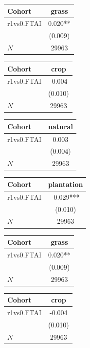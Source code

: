 {
\def\sym#1{\ifmmode^{#1}\else\(^{#1}\)\fi}
\begin{tabular}{l*{1}{c}}
\toprule
Cohort    &    grass   \\
\midrule
r1vs0.FTAI&    0.020** \\
          &  (0.009)   \\
\midrule
\(N\)     &    29963   \\
\bottomrule
\end{tabular}
}
{
\def\sym#1{\ifmmode^{#1}\else\(^{#1}\)\fi}
\begin{tabular}{l*{1}{c}}
\toprule
Cohort    &     crop   \\
\midrule
r1vs0.FTAI&   -0.004   \\
          &  (0.010)   \\
\midrule
\(N\)     &    29963   \\
\bottomrule
\end{tabular}
}
{
\def\sym#1{\ifmmode^{#1}\else\(^{#1}\)\fi}
\begin{tabular}{l*{1}{c}}
\toprule
Cohort    &  natural   \\
\midrule
r1vs0.FTAI&    0.003   \\
          &  (0.004)   \\
\midrule
\(N\)     &    29963   \\
\bottomrule
\end{tabular}
}
{
\def\sym#1{\ifmmode^{#1}\else\(^{#1}\)\fi}
\begin{tabular}{l*{1}{c}}
\toprule
Cohort    &plantation   \\
\midrule
r1vs0.FTAI&   -0.029***\\
          &  (0.010)   \\
\midrule
\(N\)     &    29963   \\
\bottomrule
\end{tabular}
}
{
\def\sym#1{\ifmmode^{#1}\else\(^{#1}\)\fi}
\begin{tabular}{l*{1}{c}}
\toprule
Cohort    &    grass   \\
\midrule
r1vs0.FTAI&    0.020** \\
          &  (0.009)   \\
\midrule
\(N\)     &    29963   \\
\bottomrule
\end{tabular}
}
{
\def\sym#1{\ifmmode^{#1}\else\(^{#1}\)\fi}
\begin{tabular}{l*{1}{c}}
\toprule
Cohort    &     crop   \\
\midrule
r1vs0.FTAI&   -0.004   \\
          &  (0.010)   \\
\midrule
\(N\)     &    29963   \\
\bottomrule
\end{tabular}
}
